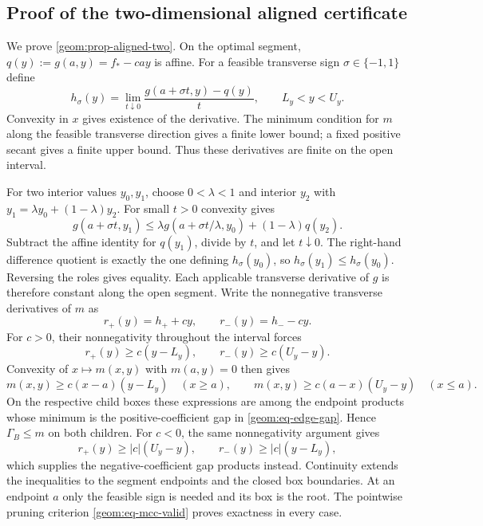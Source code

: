 \subsection{Proof of the two-dimensional aligned certificate}
\label{app:geometry:proof-aligned-two}

We prove \cref{geom:prop-aligned-two}. On the optimal segment,
$q(y):=g(a,y)=f_*-cay$ is affine. For a feasible transverse sign
$\sigma\in\{-1,1\}$ define
\[
 h_\sigma(y)=\lim_{t\downarrow0}
             \frac{g(a+\sigma t,y)-q(y)}t,
                         \qquad L_y<y<U_y.
\]
Convexity in $x$ gives existence of the derivative. The minimum
condition for $m$ along the feasible transverse direction gives a
finite lower bound; a fixed positive secant gives a finite upper
bound. Thus these derivatives are finite on the open interval.

For two interior values $y_0,y_1$, choose $0<\lambda<1$ and interior
$y_2$ with $y_1=\lambda y_0+(1-\lambda)y_2$. For small $t>0$ convexity
gives
\[
 g(a+\sigma t,y_1)
 \leq\lambda g(a+\sigma t/\lambda,y_0)+(1-\lambda)q(y_2).
\]
Subtract the affine identity for $q(y_1)$, divide by $t$, and let
$t\downarrow0$. The right-hand difference quotient is exactly the
one defining $h_\sigma(y_0)$, so
$h_\sigma(y_1)\leq h_\sigma(y_0)$. Reversing the roles gives equality.
Each applicable transverse derivative of $g$ is therefore constant
along the open segment. Write the nonnegative transverse derivatives
of $m$ as
\[
 r_+(y)=h_++cy,\qquad r_-(y)=h_--cy.
\]
For $c>0$, their nonnegativity throughout the interval forces
\[
 r_+(y)\geq c(y-L_y),\qquad
 r_-(y)\geq c(U_y-y).
\]
Convexity of $x\mapsto m(x,y)$ with $m(a,y)=0$ then gives
\[
 m(x,y)\geq c(x-a)(y-L_y)\quad(x\geq a),\qquad
 m(x,y)\geq c(a-x)(U_y-y)\quad(x\leq a).
\]
On the respective child boxes these expressions are among the endpoint
products whose minimum is the positive-coefficient gap in
\cref{geom:eq-edge-gap}. Hence $\Gamma_B\leq m$ on both children.
For $c<0$, the same nonnegativity argument gives
\[
 r_+(y)\geq |c|(U_y-y),\qquad
 r_-(y)\geq |c|(y-L_y),
\]
which supplies the negative-coefficient gap products instead.
Continuity extends the inequalities to the segment endpoints and the
closed box boundaries. At an endpoint $a$ only the feasible sign is
needed and its box is the root. The pointwise pruning criterion
\cref{geom:eq-mcc-valid} proves exactness in every case.
